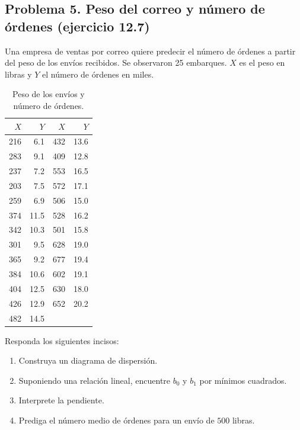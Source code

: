 \subsection{Problema 5. Peso del correo y número de órdenes (ejercicio 12.7)}

Una empresa de ventas por correo quiere predecir el número de órdenes a partir del peso de los envíos recibidos. Se observaron 25 embarques. $X$ es el peso en libras y $Y$ el número de órdenes en miles.

\begin{table}[H]
\centering
\small
\begin{tabular}{r r@{\qquad\qquad}r r}
$X$ & $Y$ & $X$ & $Y$ \\ \hline
216 & 6.1 & 432 & 13.6 \\
283 & 9.1 & 409 & 12.8 \\
237 & 7.2 & 553 & 16.5 \\
203 & 7.5 & 572 & 17.1 \\
259 & 6.9 & 506 & 15.0 \\
374 & 11.5 & 528 & 16.2 \\
342 & 10.3 & 501 & 15.8 \\
301 & 9.5 & 628 & 19.0 \\
365 & 9.2 & 677 & 19.4 \\
384 & 10.6 & 602 & 19.1 \\
404 & 12.5 & 630 & 18.0 \\
426 & 12.9 & 652 & 20.2 \\
482 & 14.5 & & \\
\end{tabular}
\caption{Peso de los envíos y número de órdenes.}
\end{table}

Responda los siguientes incisos:
\begin{enumerate}
    \item[\textbf{a)}] Construya un diagrama de dispersión.
    \item[\textbf{b)}] Suponiendo una relación lineal, encuentre $b_0$ y $b_1$ por mínimos cuadrados.
    \item[\textbf{c)}] Interprete la pendiente.
    \item[\textbf{d)}] Prediga el número medio de órdenes para un envío de $500$ libras.
\end{enumerate}

